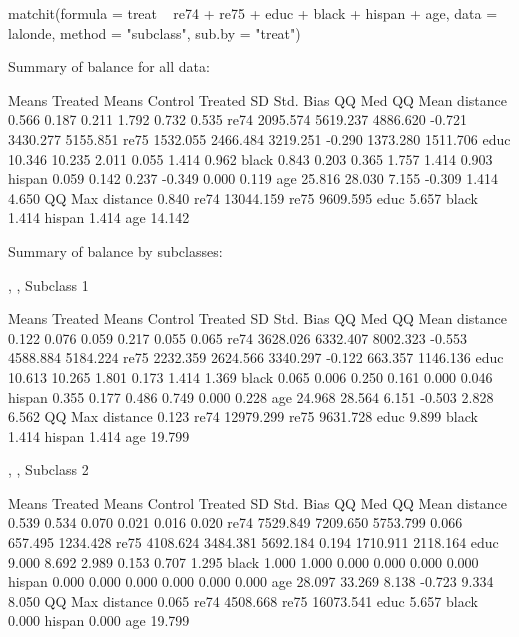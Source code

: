 \documentclass[oneside,letterpaper,titlepage]{article}
\begin{document}
\begin{enumerate}
\begin{Schunk}
\begin{Soutput}
matchit(formula = treat ~ re74 + re75 + educ + black + hispan + 
    age, data = lalonde, method = "subclass", sub.by = "treat")



Summary of balance for all data:

         Means Treated Means Control Treated SD Std. Bias   QQ Med  QQ Mean
distance         0.566         0.187      0.211     1.792    0.732    0.535
re74          2095.574      5619.237   4886.620    -0.721 3430.277 5155.851
re75          1532.055      2466.484   3219.251    -0.290 1373.280 1511.706
educ            10.346        10.235      2.011     0.055    1.414    0.962
black            0.843         0.203      0.365     1.757    1.414    0.903
hispan           0.059         0.142      0.237    -0.349    0.000    0.119
age             25.816        28.030      7.155    -0.309    1.414    4.650
            QQ Max
distance     0.840
re74     13044.159
re75      9609.595
educ         5.657
black        1.414
hispan       1.414
age         14.142


Summary of balance by subclasses:

, , Subclass 1

         Means Treated Means Control Treated SD Std. Bias    QQ Med   QQ Mean
distance         0.122         0.076      0.059     0.217     0.055     0.065
re74          3628.026      6332.407   8002.323    -0.553  4588.884  5184.224
re75          2232.359      2624.566   3340.297    -0.122   663.357  1146.136
educ            10.613        10.265      1.801     0.173     1.414     1.369
black            0.065         0.006      0.250     0.161     0.000     0.046
hispan           0.355         0.177      0.486     0.749     0.000     0.228
age             24.968        28.564      6.151    -0.503     2.828     6.562
            QQ Max
distance     0.123
re74     12979.299
re75      9631.728
educ         9.899
black        1.414
hispan       1.414
age         19.799

, , Subclass 2

         Means Treated Means Control Treated SD Std. Bias    QQ Med   QQ Mean
distance         0.539         0.534      0.070     0.021     0.016     0.020
re74          7529.849      7209.650   5753.799     0.066   657.495  1234.428
re75          4108.624      3484.381   5692.184     0.194  1710.911  2118.164
educ             9.000         8.692      2.989     0.153     0.707     1.295
black            1.000         1.000      0.000     0.000     0.000     0.000
hispan           0.000         0.000      0.000     0.000     0.000     0.000
age             28.097        33.269      8.138    -0.723     9.334     8.050
            QQ Max
distance     0.065
re74      4508.668
re75     16073.541
educ         5.657
black        0.000
hispan       0.000
age         19.799


\end{Soutput}
\end{Schunk}
\end{enumerate}
\end{document}
